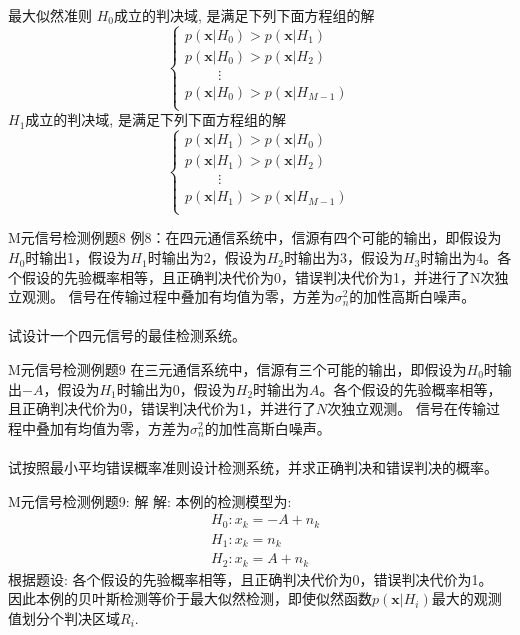 \begin{frame}[shrink]{最大似然准则}
$H_0$成立的判决域, 是满足下列下面方程组的解
\[
\begin{cases}
p(\bm{x}|H_0)> p(\bm{x}|H_1)\\
p(\bm{x}|H_0)> p(\bm{x}|H_2)\\
\hspace{1cm} \vdots\\
p(\bm{x}|H_0)> p(\bm{x}|H_{M-1})\\
\end{cases}
\]
$H_1$成立的判决域, 是满足下列下面方程组的解
\[
\begin{cases}
p(\bm{x}|H_1)> p(\bm{x}|H_0)\\
p(\bm{x}|H_1)> p(\bm{x}|H_2)\\
\hspace{1cm} \vdots\\
p(\bm{x}|H_1)> p(\bm{x}|H_{M-1})\\
\end{cases}
\]
\end{frame}

\begin{frame}{M元信号检测例题8}
例8：在四元通信系统中，信源有四个可能的输出，即假设为$H_0$时输出1，假设为$H_1$时输出为2，假设为$H_2$时输出为3，假设为$H_3$时输出为4。各个假设的先验概率相等，且正确判决代价为0，错误判决代价为1，并进行了N次独立观测。
信号在传输过程中叠加有均值为零，方差为$\sigma_n^2$的加性高斯白噪声。\\
~\\
试设计一个四元信号的最佳检测系统。
\end{frame}

\begin{frame}{M元信号检测例题9}
在三元通信系统中，信源有三个可能的输出，即假设为$H_0$时输出$-A$，假设为$H_1$时输出为0，假设为$H_2$时输出为$A$。各个假设的先验概率相等，且正确判决代价为0，错误判决代价为1，并进行了$N$次独立观测。
信号在传输过程中叠加有均值为零，方差为$\sigma_n^2$的加性高斯白噪声。\\
~\\
试按照最小平均错误概率准则设计检测系统，并求正确判决和错误判决的概率。
\end{frame}

\begin{frame}[shrink]{M元信号检测例题9: 解}
解: 本例的检测模型为:
\begin{align*}
&H_0: x_k=-A+n_k\\
&H_1: x_k=n_k\\
&H_2: x_k=A+n_k
\end{align*}
根据题设: 各个假设的先验概率相等，且正确判决代价为0，错误判决代价为1。\\
因此本例的贝叶斯检测等价于最大似然检测，即使似然函数$p(\bm{x}|H_i)$最大的观测值划分个判决区域$R_i$.
\end{frame}

